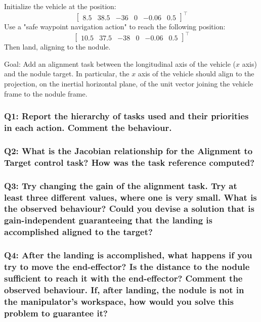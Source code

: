 \documentclass{article}
\begin{document}
Initialize the vehicle at the position:
\begin{displaymath}
\begin{bmatrix} 8.5 & 38.5 & -36 & 0 & -0.06 & 0.5 \end{bmatrix}^\top
\end{displaymath} 
Use a "safe waypoint navigation action" to reach the following position: 
\begin{displaymath}
\begin{bmatrix} 10.5 & 37.5 & -38 & 0 & -0.06 & 0.5 \end{bmatrix}^\top
\end{displaymath} 
Then land, aligning to the nodule.

Goal: Add an alignment task between the longitudinal axis of the vehicle ($x$ axis) and the nodule target. In particular, the $x$ axis of the vehicle should align to the projection, on the inertial horizontal plane, of the unit vector joining the vehicle frame to the nodule frame.

\subsubsection{Q1: Report the hierarchy of tasks used and their priorities in each action. Comment the behaviour.}

\subsubsection{Q2: What is the Jacobian relationship for the Alignment to Target control task? How was the task reference computed?}

\subsubsection{Q3: Try changing the gain of the alignment task. Try at least three different values, where one is very small. What is the observed behaviour? Could you devise a solution that is gain-independent guaranteeing that the landing is accomplished aligned to the target?}

\subsubsection{Q4: After the landing is accomplished, what happens if you try to move the end-effector? Is the distance to the nodule sufficient to reach it with the end-effector? Comment the observed behaviour. If, after landing, the nodule is not in the manipulator's workspace, how would you solve this problem to guarantee it?}
\end{document}

